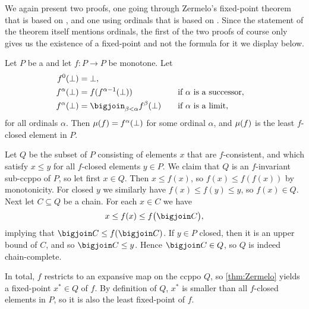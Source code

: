 We again present two proofs, one going through Zermelo's fixed-point theorem that is based on \textcite[Theorem~7.36]{moschovakis-set-theory}, and one using ordinals that is based on \textcite[Exercise~8.19]{davey-priestley-order}. Since the statement of the theorem itself mentions ordinals, the first of the two proofs of course only gives us the existence of a fixed-point and not the formula for it we display below.


\begin{theorem}
    \label{thm:Kleene-II}
    Let $P$ be a \cCPPO{} and let $f \colon P \to P$ be monotone. Let
    \begin{alignat*}{2}
        f^0(\bot)
            &= \bot, \\
        f^\alpha(\bot)
            &= f(f^{\alpha-1}(\bot))
            \quad &&\text{if $\alpha$ is a successor}, \\
        f^\alpha(\bot)
            &= \bigjoin_{\beta < \alpha} f^\beta(\bot)
            \quad &&\text{if $\alpha$ is a limit},
    \end{alignat*}
    for all ordinals $\alpha$. Then $\lfp{f} = f^\alpha(\bot)$ for some ordinal $\alpha$, and $\lfp{f}$ is the least $f$-closed element in $P$.
\end{theorem}

\begin{proofof}
    Let $Q$ be the subset of $P$ consisting of elements $x$ that are $f$-consistent, and which satisfy $x \leq y$ for all $f$-closed elements $y \in P$. We claim that $Q$ is an $f$-invariant sub-ccppo of $P$, so let first $x \in Q$. Then $x \leq f(x)$, so $f(x) \leq f(f(x))$ by monotonicity. For closed $y$ we similarly have $f(x) \leq f(y) \leq y$, so $f(x) \in Q$. Next let $C \subseteq Q$ be a chain. For each $x \in C$ we have
    \begin{equation*}
        x
            \leq f(x)
            \leq f \bigl( \bigjoin C \bigr),
    \end{equation*}
    implying that $\bigjoin C \leq f(\bigjoin C)$. If $y \in P$ closed, then it is an upper bound of $C$, and so $\bigjoin C \leq y$. Hence $\bigjoin C \in Q$, so $Q$ is indeed chain-complete.

    In total, $f$ restricts to an expansive map on the ccppo $Q$, so \cref{thm:Zermelo} yields a fixed-point $x^* \in Q$ of $f$. By definition of $Q$, $x^*$ is smaller than all $f$-closed elements in $P$, so it is also the least fixed-point of $f$.
\end{proofof}

